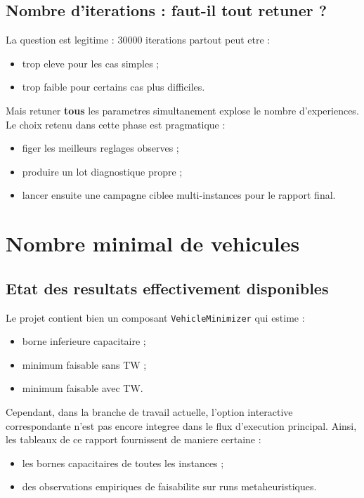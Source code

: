 \documentclass[12pt,a4paper]{report}
\begin{document}
\section{Nombre d'iterations : faut-il tout retuner ?}
La question est legitime : 30000 iterations partout peut etre :
\begin{itemize}[leftmargin=1.2cm]
  \item trop eleve pour les cas simples ;
  \item trop faible pour certains cas plus difficiles.
\end{itemize}

Mais retuner \textbf{tous} les parametres simultanement
explose le nombre d'experiences. Le choix retenu dans cette phase est pragmatique :
\begin{itemize}[leftmargin=1.2cm]
  \item figer les meilleurs reglages observes ;
  \item produire un lot diagnostique propre ;
  \item lancer ensuite une campagne ciblee multi-instances pour le rapport final.
\end{itemize}

\chapter{Nombre minimal de vehicules}

\section{Etat des resultats effectivement disponibles}
Le projet contient bien un composant \texttt{VehicleMinimizer}
qui estime :
\begin{itemize}[leftmargin=1.2cm]
  \item borne inferieure capacitaire ;
  \item minimum faisable sans TW ;
  \item minimum faisable avec TW.
\end{itemize}

Cependant, dans la branche de travail actuelle,
l'option interactive correspondante n'est pas encore integree dans le flux d'execution principal.
Ainsi, les tableaux de ce rapport fournissent de maniere certaine :
\begin{itemize}[leftmargin=1.2cm]
  \item les bornes capacitaires de toutes les instances ;
  \item des observations empiriques de faisabilite sur runs metaheuristiques.
\end{itemize}
\end{document}
